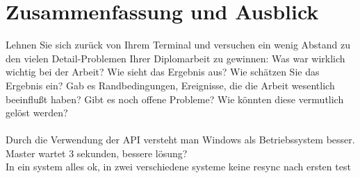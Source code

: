 \chapter{Zusammenfassung und Ausblick}\label{chp:zusammenfassung}
Lehnen Sie sich zurück von Ihrem Terminal und versuchen ein wenig Abstand zu den vielen Detail-Problemen Ihrer Diplomarbeit zu gewinnen:
Was war wirklich wichtig bei der Arbeit? 
Wie sieht das Ergebnis aus?
Wie schätzen Sie das Ergebnis ein?
Gab es Randbedingungen, Ereignisse, die die Arbeit wesentlich beeinflußt haben?
Gibt es noch offene Probleme?
Wie könnten diese vermutlich gelöst werden?\\\\




Durch die Verwendung der API versteht man Windows als Betriebssystem besser.\\
 
Master wartet 3 sekunden, bessere lösung?\\
In ein system alles ok, in zwei verschiedene systeme keine resync nach ersten test\\
 
 